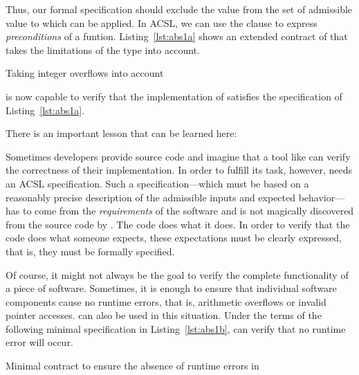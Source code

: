 Thus, our formal specification should exclude the value 
from the set of admissible value to which  can be applied.
In ACSL, we can use the  clause to express \emph{preconditions}
of a funtion.
Listing~\ref{lst:abs1a} shows an extended contract of 
that takes the limitations of the type  into account.

\begin{listing}[hbt]
\begin{minipage}{\textwidth}

\end{minipage}
\caption{\label{lst:abs1a} Taking integer overflows into account}
\end{listing}

\framacwp is now capable to verify that the implementation of
 satisfies the specification of Listing~\ref{lst:abs1a}.

There is an important lesson that can be learned here:
\begin{framed}
\label{lesson}
Sometimes developers provide source code and imagine that a tool
like \framacwp can verify the correctness of their implementation.
In order to fulfill its task, however, \framacwp needs an ACSL specification. 
Such a specification---which must be based on a reasonably precise description of the
admissible inputs and expected behavior---has to come from the \emph{requirements}
of the software and is not magically discovered from the source code by \framacwp.
The code does what it does. 
In order to verify that the code does what someone expects, these expectations
must be clearly expressed, that is, they must be formally specified.
\end{framed}

\clearpage 

Of course, it might not always be the goal to verify the complete functionality of a
piece of software.
Sometimes, it is enough to ensure that individual software components
cause no runtime errors, that is, arithmetic overflows or invalid pointer accesses.
\framacwp can also be used in this situation.
Under the terms of the following minimal specification in 
Listing~\ref{lst:abs1b}, \framacwp can verify that no runtime error will occur.

\begin{listing}[hbt]
\begin{minipage}{\textwidth}

\end{minipage}
\caption{\label{lst:abs1b} Minimal contract to ensure the absence of runtime errors in }
\end{listing}

